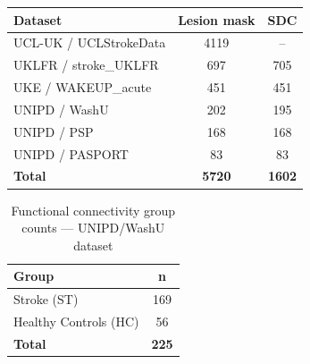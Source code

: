 \begin{table}[h]
    \centering
    \label{tab:dataset_counts_lesion_sdc}
    \begin{tabular}{lcc}
        \toprule
        \textbf{Dataset} & \textbf{Lesion mask} & \textbf{SDC} \\
        \midrule
        UCL-UK / UCLStrokeData     & 4119 & --  \\
        UKLFR / stroke\_UKLFR      & 697  & 705 \\
        UKE / WAKEUP\_acute        & 451  & 451 \\
        UNIPD / WashU              & 202  & 195 \\
        UNIPD / PSP                & 168  & 168 \\
        UNIPD / PASPORT            & 83   & 83  \\
        \midrule
        \textbf{Total}             & \textbf{5720} & \textbf{1602} \\
        \bottomrule
    \end{tabular}
\end{table}

\begin{table}[h]
    \centering
    \caption{Functional connectivity group counts — UNIPD/WashU dataset}
    \label{tab:dataset_counts_fc}
    \begin{tabular}{lc}
        \toprule
        \textbf{Group} & \textbf{n} \\
        \midrule
        Stroke (ST)            & 169 \\
        Healthy Controls (HC)  & 56  \\
        \midrule
        \textbf{Total}         & \textbf{225} \\
        \bottomrule
    \end{tabular}
\end{table}
